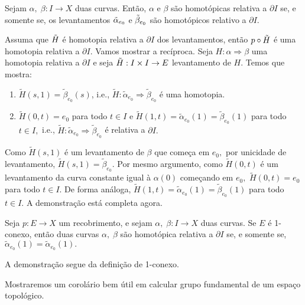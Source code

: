 \begin{corol}
    Sejam $\alpha,\;\beta:I\rightarrow X$ duas curvas. Então, $\alpha$ e $\beta$ são homotópicas relativa a $\partial I$ se, e somente se, os levantamentos $\Tilde{\alpha}_{e_0}$ e $\Tilde{\beta}_{e_0}$ são homotópicos relativo a $\partial I.$ 
\end{corol}

\begin{dem}
    Assuma que $\Tilde{H}$ é homotopia relativa a $\partial I$ dos levantamentos, então $p\circ\Tilde{H}$ é uma homotopia relativa a $\partial I.$ Vamos mostrar a recíproca. Seja $H:\alpha\Rightarrow \beta$ uma homotopia relativa a $\partial I$ e seja $\Tilde{H}:I\times I\rightarrow E$ levantamento de $H$. Temos que mostra:
    \begin{enumerate}
        \item $\tilde{H}(s,1)=\tilde{\beta}_{e_0}(s)$, i.e., $\tilde{H}:\tilde{\alpha}_{e_0}\Rightarrow\tilde{\beta}_{e_0}$ é uma homotopia.
        \item $\tilde{H}(0,t)=e_0$ para todo $t\in I$ e $\tilde{H}(1,t)=\tilde{\alpha}_{e_0}(1)=\tilde{\beta}_{e_0}(1)$ para todo $t\in I,$ i.e., $\tilde{H}:\tilde{\alpha}_{e_0}\Rightarrow\tilde{\beta}_{e_0}$ é relativa a $\partial I.$
    \end{enumerate}
    Como $\tilde{H}(s,1)$ é um levantamento de $\beta$ que começa em $e_0,$ por unicidade de levantamento, $\tilde{H}(s,1)=\tilde{\beta}_{e_0}.$ Por mesmo argumento, como $\tilde{H}(0,t)$ é um levantamento da curva constante igual à $\alpha(0)$ começando em $e_0,$ $\tilde{H}(0,t)=e_0$ para todo $t\in I.$ De forma análoga, $\tilde{H}(1,t)=\tilde{\alpha}_{e_0}(1)=\tilde{\beta}_{e_0}(1)$ para todo $t\in I.$ A demonstração está completa agora. 
\end{dem}

\begin{corol}
    Seja $p:E\rightarrow X$ um recobrimento, e sejam $\alpha,\;\beta:I\rightarrow X$ duas curvas. Se $E$ é 1-conexo, então duas curvas $\alpha,\;\beta$ são homotópica relativa a $\partial I$ se, e somente se, $\tilde{\alpha}_{e_0}(1)=\tilde{\alpha}_{e_0}(1).$
\end{corol}

\begin{dem}
    A demonstração segue da definição de 1-conexo.
\end{dem}

Mostraremos um corolário bem útil em calcular grupo fundamental de um espaço topológico.

